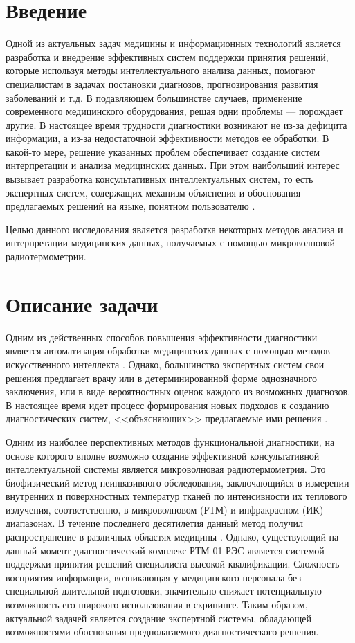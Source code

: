 \section*{Введение}

Одной из актуальных задач медицины и информационных технологий является разработка и внедрение эффективных систем поддержки принятия решений, которые используя методы интеллектуального анализа данных, помогают специалистам в задачах постановки диагнозов, прогнозирования развития заболеваний и т.д.  В подавляющем большинстве случаев, применение современного медицинского оборудования, решая одни проблемы --- порождает другие. В настоящее время трудности диагностики возникают не из-за дефицита информации, а из-за недостаточной эффективности методов ее обработки. В какой-то мере, решение указанных проблем обеспечивает создание систем интерпретации и анализа медицинских данных. При этом наибольший интерес вызывает разработка консультативных интеллектуальных систем, то есть экспертных систем, содержащих механизм объяснения и обоснования предлагаемых решений на языке, понятном пользователю \cite{kobrinsky1}.

Целью данного исследования является разработка некоторых методов анализа и интерпретации медицинских данных, получаемых с помощью микроволновой радиотермометрии.

\section{Описание задачи}

Одним из действенных способов повышения эффективности диагностики является автоматизация обработки медицинских данных с помощью методов искусственного интеллекта \cite{yasnitsky,burke,kononenko1,kononenko2,lesmo}. Однако, большинство экспертных систем свои решения предлагает врачу или в детерминированной форме однозначного заключения, или в виде вероятностных оценок каждого из возможных диагнозов. В настоящее время идет процесс формирования новых подходов к созданию диагностических систем, <<объясняющих>> предлагаемые ими решения \cite{kobrinsky1,kobrinsky2}.

Одним из наиболее перспективных методов функциональной диагностики, на основе которого вполне возможно создание эффективной консультативной интеллектуальной системы является микроволновая радиотермометрия. Это биофизический метод неинвазивного обследования, заключающийся в измерении внутренних и поверхностных температур тканей по интенсивности их теплового излучения, соответственно, в микроволновом (РТМ) и инфракрасном (ИК) диапазонах. В течение последнего десятилетия данный метод получил распространение в различных областях медицины \cite{losevhoperskov}. Однако, существующий на данный момент диагностический комплекс РТМ-01-РЭС является системой поддержки принятия решений специалиста высокой квалификации. Сложность восприятия информации, возникающая у медицинского персонала без специальной длительной подготовки, значительно снижает потенциальную возможность его широкого использования в скрининге. Таким образом, актуальной задачей является создание экспертной системы, обладающей возможностями обоснования предполагаемого диагностического решения.

